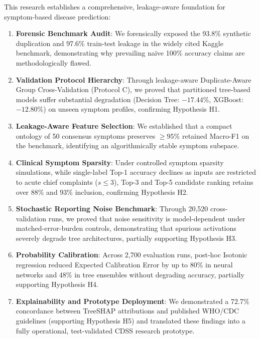 This research establishes a comprehensive, leakage-aware foundation for symptom-based disease prediction:
\begin{enumerate}
    \item \textbf{Forensic Benchmark Audit}: We forensically exposed the 93.8\% synthetic duplication and 97.6\% train-test leakage in the widely cited Kaggle benchmark, demonstrating why prevailing na\"{i}ve 100\% accuracy claims are methodologically flawed.
    \item \textbf{Validation Protocol Hierarchy}: Through leakage-aware Duplicate-Aware Group Cross-Validation (Protocol C), we proved that partitioned tree-based models suffer substantial degradation (Decision Tree: $-17.44\%$, XGBoost: $-12.80\%$) on unseen symptom profiles, confirming Hypothesis H1.
    \item \textbf{Leakage-Aware Feature Selection}: We established that a compact ontology of 50 consensus symptoms preserves $\ge 95\%$ retained Macro-F1 on the benchmark, identifying an algorithmically stable symptom subspace.
    \item \textbf{Clinical Symptom Sparsity}: Under controlled symptom sparsity simulations, while single-label Top-1 accuracy declines as inputs are restricted to acute chief complaints ($s \le 3$), Top-3 and Top-5 candidate ranking retains over 88\% and 93\% inclusion, confirming Hypothesis H2.
    \item \textbf{Stochastic Reporting Noise Benchmark}: Through 20,520 cross-validation runs, we proved that noise sensitivity is model-dependent under matched-error-burden controls, demonstrating that spurious activations severely degrade tree architectures, partially supporting Hypothesis H3.
    \item \textbf{Probability Calibration}: Across 2,700 evaluation runs, post-hoc Isotonic regression reduced Expected Calibration Error by up to 80\% in neural networks and 48\% in tree ensembles without degrading accuracy, partially supporting Hypothesis H4.
    \item \textbf{Explainability and Prototype Deployment}: We demonstrated a 72.7\% concordance between TreeSHAP attributions and published WHO/CDC guidelines (supporting Hypothesis H5) and translated these findings into a fully operational, test-validated CDSS research prototype.
\end{enumerate}

